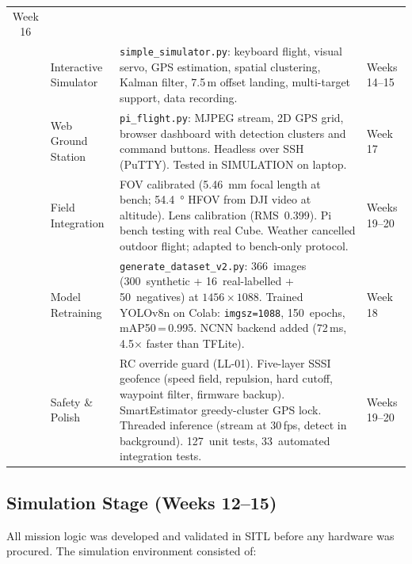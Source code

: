\begin{table}[H]
\begin{tabularx}{\linewidth}{@{}c l X l@{}}
    Week 16 \\
\addlinespace
6 & Interactive Simulator &
    \texttt{simple\_simulator.py}: keyboard flight, visual servo,
    GPS estimation, spatial clustering, Kalman filter,
    7.5\,m offset landing, multi-target support, data recording. &
    Weeks 14--15 \\
\addlinespace
7 & Web Ground Station &
    \texttt{pi\_flight.py}: MJPEG stream, 2D GPS grid, browser
    dashboard with detection clusters and command buttons.
    Headless over SSH (PuTTY).  Tested in SIMULATION on laptop. &
    Week 17 \\
\addlinespace
8 & Field Integration &
    FOV calibrated (\SI{5.46}{\milli\metre} focal length at bench;
    \SI{54.4}{\degree} HFOV from DJI video at altitude).  Lens
    calibration (RMS~0.399).  Pi bench testing with real Cube.
    Weather cancelled outdoor flight; adapted to bench-only protocol. &
    Weeks 19--20 \\
\addlinespace
9 & Model Retraining &
    \texttt{generate\_dataset\_v2.py}: 366~images (300~synthetic +
    16~real-labelled + 50~negatives) at $1456\times1088$.
    Trained YOLOv8n on Colab: \texttt{imgsz=1088}, 150~epochs,
    mAP50\,=\,0.995.  NCNN backend added (72\,ms, 4.5$\times$
    faster than TFLite). &
    Week 18 \\
\addlinespace
10 & Safety \& Polish &
    RC override guard (LL-01).  Five-layer SSSI geofence (speed field, repulsion, hard cutoff,
    waypoint filter, firmware backup).  SmartEstimator greedy-cluster GPS lock.  Threaded
    inference (stream at 30\,fps, detect in background).
    127~unit tests, 33~automated integration tests. &
    Weeks 19--20 \\
\bottomrule
\end{tabularx}
\end{table}

\subsection{Simulation Stage (Weeks 12--15)}\label{sec:sim-stage}

All mission logic was developed and validated in SITL before any
hardware was procured.  The simulation environment consisted of:

